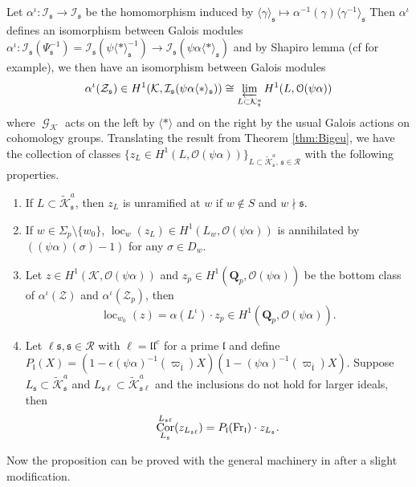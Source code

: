 \documentclass[leqno]{amsart}
\theoremstyle{definition}
\theoremstyle{remark}
\newcommand{\oo}{\mathcal{O}}
\newcommand{\eo}{\EuScript{O}}
\newcommand{\Qp}{\mathbf{Q}_p}
\DeclareMathOperator{\Cor}{Cor}
\DeclareMathOperator{\Gal}{\mathcal{G}}
\newcommand{\Fr}{\textnormal{Fr}} %
\newcommand{\fl}{\mathfrak{l}}
\newcommand{\fs}{\mathfrak{s}}
\newcommand{\K}{{\mathcal{K}}} %
\newcommand{\bl}{{\bar{\fl}}}
\newcommand{\I}{\mathcal{I}} %
\DeclareMathOperator{\loc}{loc}
\begin{document}
Let $\alpha^\iota\colon \I_\fs\to \I_\fs$ be the homomorphism
induced by $\langle\gamma\rangle_{\fs}\mapsto 
\alpha^{-1}(\gamma)\langle \gamma^{-1}\rangle_{\fs}$
Then $\alpha^\iota$ defines an isomorphism between Galois modules
$\alpha^\iota\colon \I_\fs(\Psi_\fs^{-1})=
\I_\fs(\psi\langle*\rangle^{-1}_\fs)
\to \I_\fs(\psi\alpha\langle*\rangle_\fs)$
and by Shapiro lemma (cf \cite[Lem 5.8]{Schneider2016} for example), 
we then have an isomorphism between Galois modules
\begin{equation*}
    \alpha^\iota(\mathcal{Z}_\fs) \in 
    H^1(\K, \I_\fs(\psi\alpha\langle*\rangle_\fs))\cong 
    \varprojlim_{L\subset {\K}_\fs^a}
    H^1(L, \eo(\psi\alpha))
\end{equation*}
where $\Gal_\K$ acts on the left by $\langle*\rangle$
and on the right by the usual 
Galois actions on cohomology groups.
Translating the result from Theorem \ref{thm:Bigeu}, 
we have the collection of classes 
$\{ z_{L}\in H^1(L, \oo(\psi\alpha))\}
_{L\subset \widetilde{\K}^a_\fs, \,\fs\in \mathcal{R}}$ with the 
following properties.

\begin{enumerate}
    \item If $L\subset \tilde{\K}^a_\fs$, then 
    $z_{L}$ is unramified at $w$ if $w\notin S$ and $w\nmid \fs$.
    \item If $w\in \Sigma_p\setminus\{w_0\}$, 
    $\loc_{w}(z_L)\in H^1(L_w, \oo(\psi\alpha))$
    is annihilated by $((\psi\alpha)(\sigma)-1)$
    for any $\sigma\in D_{w}$.
    \item Let $z\in H^1(\K, \oo(\psi\alpha))$ and
    $z_p\in H^1(\Qp, \oo(\psi\alpha))$ be the bottom class of 
    $\alpha^\iota(\mathcal{Z})$ and $\alpha^\iota(\mathcal{Z}_p)$, then
    \[
        \loc_{w_0}(z)=\alpha(L^\iota)\cdot z_{p}\in 
        H^1(\Qp, \oo(\psi\alpha)).
    \]
    \item Let $\ell\fs,\fs\in \mathcal{R}$ with $\ell=\fl\fl^c$
    for a prime $\fl$ and define 
    $P_\fl(X)=(1-\epsilon(\psi\alpha)^{-1}(\varpi_\bl)X)
    (1-(\psi\alpha)^{-1}(\varpi_\bl)X)$.
    Suppose $L_\fs\subset \widetilde{\K}^a_\fs$ 
    and $L_{\fs\ell}\subset \widetilde{\K}^a_{\fs\ell}$ 
    and the inclusions do not hold for larger ideals, then
    \begin{equation*}
        \Cor_{L_{\fs}}^{L_{\fs\ell}}(z_{L_{\fs\ell}})=
        P_\fl(\Fr_\fl)\cdot z_{L_{\fs}}.
    \end{equation*}
\end{enumerate}

Now the proposition can be proved 
with the general machinery in \cite{Rubin}
after a slight modification.
\end{document}
